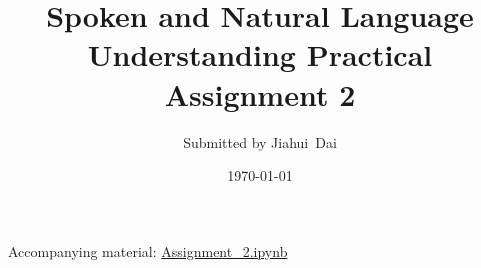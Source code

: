 \documentclass[a4paper]{article}
\begin{document}
\title{
    Spoken and Natural Language Understanding Practical\\
    Assignment 2
}
\author{Submitted by Jiahui~Dai}
\date{\today}
\maketitle

Accompanying material: \href{file:Assignment_2.ipynb}{Assignment\_2.ipynb}



% 


\newpage
\end{document}
